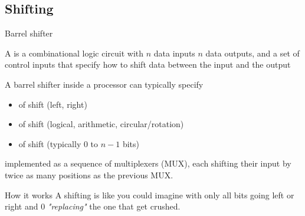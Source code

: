 \subsection{Shifting}
\begin{parag}{Barrel shifter}
    \begin{definition}
        A  is a combinational logic circuit with $n$ data inputs $n$ data outputs, and a set of control inputs that specify how to shift data between the input and the output
    \end{definition}
    A barrel shifter inside a processor can typically specify
    \begin{itemize}
        \item {} of shift (left, right)
        \item {} of shift (logical, arithmetic, circular/rotation)
        \item {} of shift (typically $0$ to $n-1$ bits)
    \end{itemize}
    implemented as a sequence of multiplexers (MUX), each shifting their input by twice as many positions as the previous MUX.
\begin{subparag}{How it works}
    A shifting is like you could imagine with only all bits going left or right and $0$ \textit{"replacing"} the one that get crushed.
\end{subparag}
\end{parag}


















